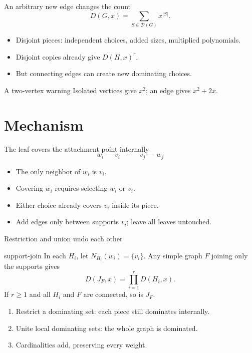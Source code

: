 \documentclass{beamer}
\begin{document}
\begin{frame}{An arbitrary new edge changes the count}
\[D(G,x)=\sum_{S\in\mathcal D(G)}x^{|S|}.\]
\begin{itemize}
\item Disjoint pieces: independent choices, added sizes, multiplied polynomials.
\item Disjoint copies already give $D(H,x)^r$.
\item But connecting edges can create new dominating choices.
\end{itemize}
\begin{alertblock}{A two-vertex warning}
Isolated vertices give $x^2$; an edge gives $x^2+2x$.
\end{alertblock}
\end{frame}
\section{Mechanism}
\begin{frame}{The leaf covers the attachment point internally}
\[w_i\;\text{---}\;v_i\quad\cdots\quad v_j\;\text{---}\;w_j\]
\begin{itemize}
\item The only neighbor of $w_i$ is $v_i$.
\item Covering $w_i$ requires selecting $w_i$ or $v_i$.
\item Either choice already covers $v_i$ inside its piece.
\item Add edges only between supports $v_i$; leave all leaves untouched.
\end{itemize}
\end{frame}
\begin{frame}{Restriction and union undo each other}
\begin{bookresult}{support-join}
In each $H_i$, let $N_{H_i}(w_i)=\{v_i\}$. Any simple graph $F$ joining only the supports gives
\[D(J_F,x)=\prod_{i=1}^rD(H_i,x).\]
If $r\geq1$ and all $H_i$ and $F$ are connected, so is $J_F$.
\end{bookresult}
\begin{enumerate}
\item Restrict a dominating set: each piece still dominates internally.
\item Unite local dominating sets: the whole graph is dominated.
\item Cardinalities add, preserving every weight.
\end{enumerate}
\end{frame}
\end{document}

